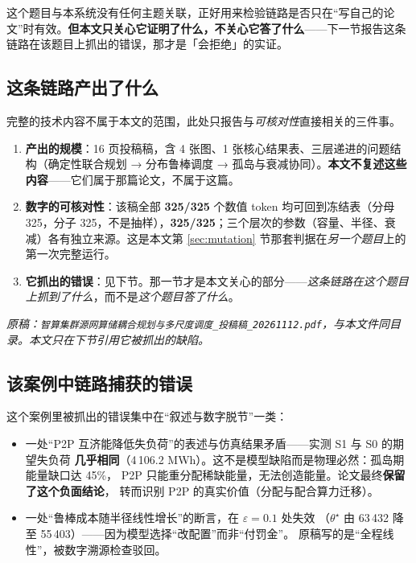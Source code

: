 \documentclass[11pt,a4paper]{article}
\begin{document}
这个题目与本系统没有任何主题关联，正好用来检验链路是否只在“写自己的论文”时有效。\textbf{但本文只关心它证明了什么，不关心它答了什么}——下一节报告这条链路在该题目上抓出的错误，那才是「会拒绝」的实证。

\subsection{这条链路产出了什么}
完整的技术内容不属于本文的范围，此处只报告与\emph{可核对性}直接相关的三件事。

\begin{enumerate}[leftmargin=1.6em,itemsep=3pt]
\item \textbf{产出的规模}：16 页投稿稿，含 4 张图、1 张核心结果表、三层递进的问题结构（确定性联合规划 → 分布鲁棒调度 → 孤岛与衰减协同）。\textbf{本文不复述这些内容}——它们属于那篇论文，不属于这篇。

\item \textbf{数字的可核对性}：该稿全部 \textbf{325/325} 个数值 token 均可回到冻结表（分母 325，分子 325，不是抽样），\textbf{325/325}；三个层次的参数（容量、半径、衰减）各有独立来源。这是本文第 \ref{sec:mutation} 节那套判据在\emph{另一个题目}上的第一次完整运行。

\item \textbf{它抓出的错误}：见下节。那一节才是本文关心的部分——\emph{这条链路在这个题目上抓到了什么}，而不是\emph{这个题目答了什么}。
\end{enumerate}

\noindent\emph{原稿：\texttt{智算集群源网算储耦合规划与多尺度调度\_投稿稿\_20261112.pdf}，与本文件同目录。本文只在下节引用它被抓出的缺陷。}

\subsection{该案例中链路捕获的错误}

这个案例里被抓出的错误集中在“叙述与数字脱节”一类：
\begin{itemize}[leftmargin=1.6em,itemsep=1pt]
\item 一处“P2P 互济能降低失负荷”的表述与仿真结果矛盾——实测 S1 与 S0 的期望失负荷
  \textbf{几乎相同}（4\,106.2 MWh）。这不是模型缺陷而是物理必然：孤岛期能量缺口达 45\%，
  P2P 只能重分配稀缺能量，无法创造能量。论文最终\textbf{保留了这个负面结论}，
  转而识别 P2P 的真实价值（分配与配合算力迁移）。
\item 一处“鲁棒成本随半径线性增长”的断言，在 $\varepsilon=0.1$ 处失效
  （$\theta^\star$ 由 63\,432 降至 55\,403）——因为模型选择“改配置”而非“付罚金”。
  原稿写的是“全程线性”，被数字溯源检查驳回。
\end{itemize}
\end{document}
